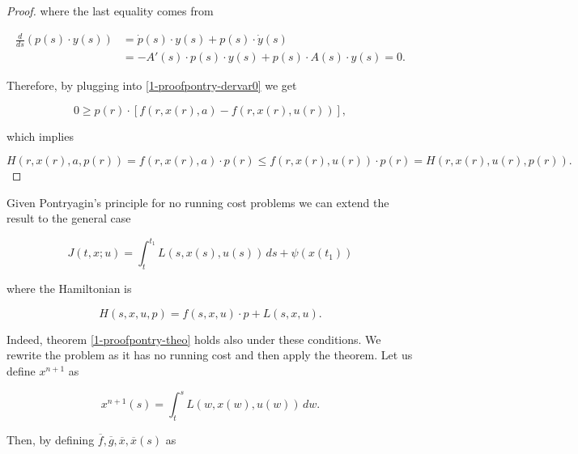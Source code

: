 \begin{theorem}
\begin{proof}
        where the last equality comes from

        \begin{align*}
            \frac{d}{ds}\left(p(s)\cdot y(s)\right) & = \dot{p}(s)\cdot y(s) + p(s)\cdot \dot{y}(s) \\
            & = -A'(s)\cdot p(s)\cdot y(s) + p(s) \cdot A(s)\cdot y(s) = 0.
        \end{align*}

        Therefore, by plugging into \eqref{1-proofpontry-dervar0} we get

        \[0\geq p(r)\cdot[f(r,x(r),a)-f(r,x(r),u(r))],\]

        which implies

        \[H(r,x(r),a,p(r)) = f(r,x(r),a) \cdot p(r) \leq f(r,x(r),u(r)) \cdot p(r) = H(r,x(r),u(r),p(r)).\]
    \end{proof}
\end{theorem}

Given Pontryagin's principle for no running cost problems we can extend the result to the general case

\begin{equation*}
    J(t,x;u) = \int_t^{t_1} L(s,x(s),u(s)) \,ds + \psi(x(t_1))
\end{equation*}

where the Hamiltonian is

\begin{equation*}
    H(s,x,u,p) = f(s,x,u)\cdot p + L(s,x,u).
\end{equation*}

Indeed, theorem \ref{1-proofpontry-theo} holds also under these conditions. We rewrite the problem as it has no 
running cost and then apply the theorem. Let us define $x^{n+1}$ as


\begin{equation*}
    x^{n+1}(s) = \int_t^s L(w,x(w),u(w)) \,dw.
\end{equation*}

Then, by defining $\overline{f}, \overline{g}, \overline{x},\overline{x}(s)$ as

